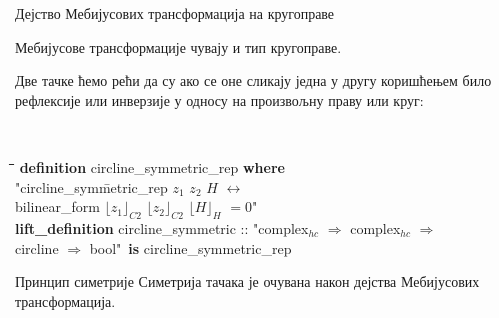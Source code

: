 \documentclass[slidestop, compress, mathserif, containsverbatim, xcolor=dvipsnames]{beamer}
\newcommand{\Repnzv}[1]{\ensuremath{\lfloor#1\rfloor_{C2}}}
\newcommand{\Repcm}[1]{\ensuremath{\lfloor#1\rfloor_{H}}}
\begin{document}
\begin{frame}{Дејство Мебијусових трансформација на кругоправе}
    \begin{block}{}
    Мебијусове трансформације чувају и тип кругоправе.
  \end{block}

    Две тачке ћемо рећи да су  ако
    се оне сликају једна у другу коришћењем било рефлексије или инверзије
    у односу на произвољну праву или круг:

    \begin{footnotesize}
      {\tt
        \begin{tabbing}
          \hspace{5mm}\=\hspace{5mm}\=\hspace{5mm}\=\hspace{5mm}\=\hspace{5mm}\=\kill
          \textbf{definition} circline\_symmetric\_rep \textbf{where}\\
          \>"{}circline\_sym\=metric\_rep $z_1$ $z_2$ $H$ $\longleftrightarrow$ \\
          \>\>bilinear\_form $\Repnzv{z_1}$ $\Repnzv{z_2}$ $\Repcm{H}$ $= 0$"\\
      \textbf{lift\_definition} circline\_symmetric :: "{}complex$_{hc}$ $\Rightarrow$ complex$_{hc}$ $\Rightarrow$ \\
      \>circline $\Rightarrow$ bool"\ \textbf{is} circline\_symmetric\_rep
        \end{tabbing}
        }
    \end{footnotesize}
    
  
  \begin{block}{Принцип симетрије}
    Симетрија тачака је очувана након дејства Мебијусових трансформација.
  \end{block}
\end{frame}
\end{document}
